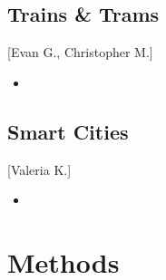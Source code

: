 \documentclass[12pt]{article}                         %
\begin{document}
\subsection{Trains \& Trams}[Evan G., Christopher M.]
\begin{itemize}
    \item 
\end{itemize}

\subsection{Smart Cities}[Valeria K.]
\begin{itemize}
    \item 
\end{itemize}



\newpage
\section{Methods}


\newpage


\end{document}

